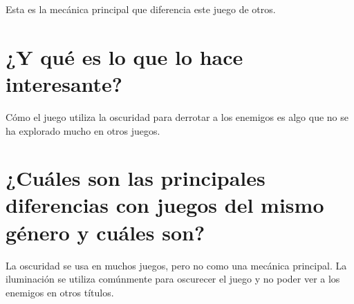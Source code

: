 \begin{multicols}{2}
    Esta es la mecánica principal que diferencia este juego de otros.

    \section{¿Y qué es lo que lo hace interesante?}
    Cómo el juego utiliza la oscuridad para derrotar a los enemigos es algo que no se ha explorado mucho en otros juegos.

    \section[Principales diferencias]{¿Cuáles son las principales diferencias con juegos del mismo género y cuáles son?}
    La oscuridad se usa en muchos juegos, pero no como una mecánica principal. La iluminación se utiliza comúnmente para oscurecer el juego y no poder ver a los enemigos en otros títulos.

    \end{multicols}
